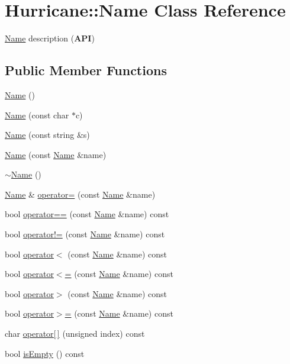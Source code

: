 \hypertarget{classHurricane_1_1Name}{}\section{Hurricane\+:\+:Name Class Reference}
\label{classHurricane_1_1Name}


\hyperlink{classHurricane_1_1Name}{Name} description ({\bfseries A\+PI})  


\subsection*{Public Member Functions}
\begin{DoxyCompactItemize}
\item 
\hyperlink{classHurricane_1_1Name_a42636ecb0d4d7d03eb881420a244038b}{Name} ()
\item 
\hyperlink{classHurricane_1_1Name_a754d54199d54c5e4568421c89f0682cb}{Name} (const char $\ast$c)
\item 
\hyperlink{classHurricane_1_1Name_a446df795ebe2e641710696bf775eb491}{Name} (const string \&s)
\item 
\hyperlink{classHurricane_1_1Name_a56ffee3e75dc343c7ec8b61102c1d3a2}{Name} (const \hyperlink{classHurricane_1_1Name}{Name} \&name)
\item 
\hyperlink{classHurricane_1_1Name_a1ce605ce16980334f93d7cc278984842}{$\sim$\+Name} ()
\item 
\hyperlink{classHurricane_1_1Name}{Name} \& \hyperlink{classHurricane_1_1Name_adcd165de286782c011acc31727adb4a1}{operator=} (const \hyperlink{classHurricane_1_1Name}{Name} \&name)
\item 
bool \hyperlink{classHurricane_1_1Name_a3b728f0b8aa027639ebd47c60addf738}{operator==} (const \hyperlink{classHurricane_1_1Name}{Name} \&name) const
\item 
bool \hyperlink{classHurricane_1_1Name_aff97f0bcf698ad76f6f3c9a4c4833cc3}{operator!=} (const \hyperlink{classHurricane_1_1Name}{Name} \&name) const
\item 
bool \hyperlink{classHurricane_1_1Name_a9ce91a54cd340fb1e14baf56797f1577}{operator$<$} (const \hyperlink{classHurricane_1_1Name}{Name} \&name) const
\item 
bool \hyperlink{classHurricane_1_1Name_a9704f9fe4c605a86de13b6a8d90feab2}{operator$<$=} (const \hyperlink{classHurricane_1_1Name}{Name} \&name) const
\item 
bool \hyperlink{classHurricane_1_1Name_a33bd981f4f6923a50c603cd06283032d}{operator$>$} (const \hyperlink{classHurricane_1_1Name}{Name} \&name) const
\item 
bool \hyperlink{classHurricane_1_1Name_a241d0568f16c8ba60d4c5148be6a48b3}{operator$>$=} (const \hyperlink{classHurricane_1_1Name}{Name} \&name) const
\item 
char \hyperlink{classHurricane_1_1Name_a2e6f3869321016de8f98f2b35f136ab4}{operator\mbox{[}$\,$\mbox{]}} (unsigned index) const
\item 
bool \hyperlink{classHurricane_1_1Name_a6c05cf200a0aeb95f98603fa0c9c9d4b}{is\+Empty} () const
\end{DoxyCompactItemize}


